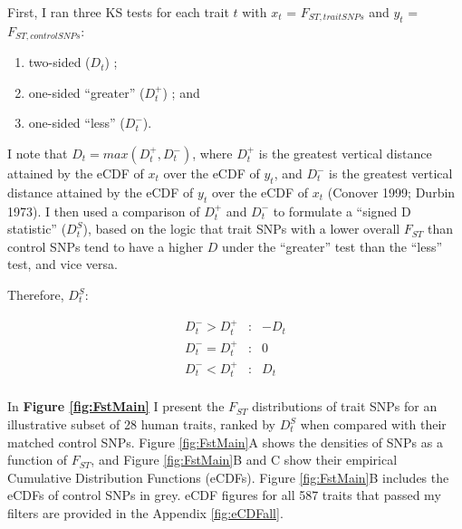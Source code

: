 \documentclass[
]{book}
\begin{document}
First, I ran three KS tests for each trait \(t\) with \(x_t\) = \(F_{ST, trait SNPs}\) and \(y_t\) = \(F_{ST, control SNPs}\):

\begin{enumerate}
\def\labelenumi{\arabic{enumi}.}
\item
  two-sided (\(D_t\)) ;
\item
  one-sided ``greater'' (\(D_t^+\)) ; and
\item
  one-sided ``less'' (\(D_t^-\)).
\end{enumerate}

I note that \(D_{t} = max(D_t^+, D_t^-)\), where \(D_t^+\) is the greatest vertical distance attained by the eCDF of \(x_t\) over the eCDF of \(y_t\), and \(D_t^-\) is the greatest vertical distance attained by the eCDF of \(y_t\) over the eCDF of \(x_t\) (Conover 1999; Durbin 1973). I then used a comparison of \(D_t^+\) and \(D_t^-\) to formulate a ``signed D statistic'' (\(D_t^S\)), based on the logic that trait SNPs with a lower overall \(F_{ST}\) than control SNPs tend to have a higher \(D\) under the ``greater'' test than the ``less'' test, and vice versa.

Therefore, \({D_t^S}\):

\[
\begin{aligned}
D_t^- > D_t^+ &: &-D_t \\
D_t^- = D_t^+ &: &0 \\
D_t^- < D_t^+ &: &D_t \\
\end{aligned}
\]

In \textbf{Figure \ref{fig:FstMain}} I present the \(F_{ST}\) distributions of trait SNPs for an illustrative subset of 28 human traits, ranked by \({D_t^S}\) when compared with their matched control SNPs. Figure \ref{fig:FstMain}A shows the densities of SNPs as a function of \(F_{ST}\), and Figure \ref{fig:FstMain}B and C show their empirical Cumulative Distribution Functions (eCDFs). Figure \ref{fig:FstMain}B includes the eCDFs of control SNPs in grey. eCDF figures for all 587 traits that passed my filters are provided in the Appendix \ref{fig:eCDFall}.
\end{document}
